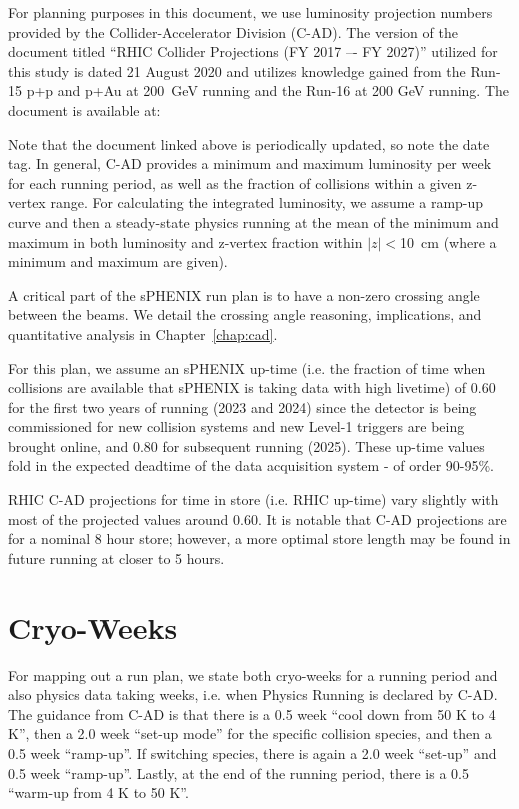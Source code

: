For planning purposes in this document, we use luminosity projection numbers provided by the Collider-Accelerator Division (C-AD).   The version of the document titled 
``RHIC Collider Projections (FY 2017 –- FY 2027)'' utilized for this study is dated 21 August 2020 and utilizes knowledge gained from the Run-15 p+p and p+Au at 200~GeV running and the Run-16 \auau at 200 GeV running.   The document is available at:

\vspace{0.1in}
{\color{blue}{http://www.rhichome.bnl.gov/RHIC/Runs/RhicProjections.pdf}} 
\vspace{0.1in}

Note that the document linked above is periodically updated, so note the date tag.  In general, C-AD provides a minimum and maximum luminosity per week for each running period, as well as the fraction of collisions within a given z-vertex range. For calculating the integrated luminosity, we assume a ramp-up curve and then a steady-state physics running at the mean of the minimum and maximum in both luminosity and z-vertex fraction within $|z|<$10~cm (where a minimum and maximum are given).  

A critical part of the sPHENIX run plan is to have a non-zero crossing angle between the beams.    We detail the crossing angle reasoning, implications, and quantitative analysis in Chapter~\ref{chap:cad}.    

For this plan, we assume an sPHENIX up-time (i.e. the fraction of time when collisions are available that sPHENIX is taking data with high livetime) of 0.60 for the first two years of running (2023 and 2024) since the detector is being commissioned for new collision systems and new Level-1 triggers are being brought online, and 0.80 for subsequent running (2025).   These up-time values fold in the expected deadtime of the data acquisition system - of order 90-95\%.

RHIC C-AD projections for time in store (i.e. RHIC up-time) vary slightly with most of the projected values around 0.60. It is notable that C-AD projections are for a nominal 8 hour store; however, a more optimal store length may be found in future running at closer to 5 hours.

\section{Cryo-Weeks}

For mapping out a run plan, we state both cryo-weeks for a running period and also physics data taking weeks, i.e. when Physics Running is declared by C-AD.   The guidance from C-AD is that there is a 0.5 week ``cool down from 50 K to 4 K'', then a 2.0 week ``set-up mode'' for the specific collision species, and then a 0.5 week ``ramp-up''.   If switching species, there is again a 2.0 week ``set-up'' and 0.5 week ``ramp-up''.    Lastly, at the end of the running period, there is a 0.5 ``warm-up from 4 K to 50 K''.  

